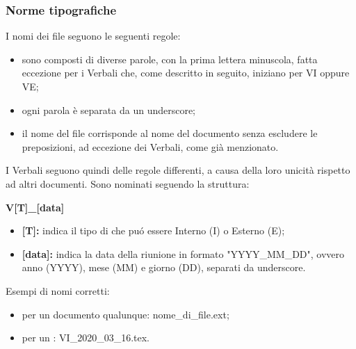     \subsubsection{Norme tipografiche}
        I nomi dei file seguono le seguenti regole:
        \begin{itemize}
          \item sono composti di diverse parole, con la prima lettera minuscola, fatta eccezione per i Verbali che, come descritto in seguito, iniziano per VI oppure VE;
          \item ogni parola è separata da un underscore;
          \item il nome del file corrisponde al nome del documento senza escludere le preposizioni, ad eccezione dei Verbali, come già menzionato.
        \end{itemize}
        I Verbali seguono quindi delle regole differenti, a causa della loro unicità rispetto ad altri documenti. Sono nominati seguendo la struttura:
        \begin{center}
          \textbf{{V[T]\_[data]}}
        \end{center}
        \begin{itemize}
          \item \textbf{[T]:} indica il tipo di \Verbale{} che puó essere Interno (I) o Esterno (E);
          \item \textbf{[data]:} indica la data della riunione in formato "YYYY\_MM\_DD", ovvero anno (YYYY), mese (MM) e giorno (DD), separati da underscore.
        \end{itemize}
        Esempi di nomi corretti:
        \begin{itemize}
          \item per un documento qualunque: nome\_di\_file.ext;
          \item per un \Verbale{}: VI\_2020\_03\_16.tex.
        \end{itemize}

